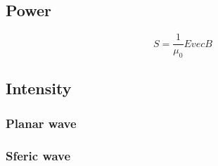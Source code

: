 \documentclass[Master.tex]{subfiles}
\begin{document}
\begin{multicols}{2}
				   \subsection{Power}
						    \[
								     S = \frac{1}{\mu _{0} } E vec B
						    \]

				   \subsection{Intensity}
						    \subsubsection{Planar wave}
						    \subsubsection{Sferic wave}

\end{multicols}
\end{document}
